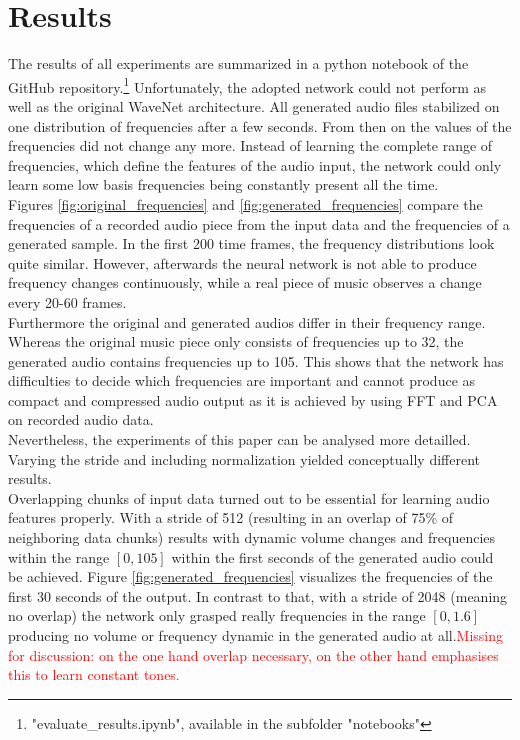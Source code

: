 \documentclass[10pt,conference,compsocconf]{IEEEtran}
\begin{document}
\section{Results}
The results of all experiments are summarized in a python notebook of the GitHub repository.\footnote{"evaluate\_results.ipynb", available in the subfolder "notebooks"} Unfortunately, the adopted network could not perform as well as the original WaveNet architecture. All generated audio files stabilized on one distribution of frequencies after a few seconds. From then on the values of the frequencies did not change any more. Instead of learning the complete range of frequencies, which define the features of the audio input, the network could only learn some low basis frequencies being constantly present all the time.\\
Figures \ref{fig:original_frequencies} and \ref{fig:generated_frequencies} compare the frequencies of a recorded audio piece from the input data and the frequencies of a generated sample. In the first 200 time frames, the frequency distributions look quite similar. However, afterwards the neural network is not able to produce frequency changes continuously, while a real piece of music observes a change every 20-60 frames.\\
Furthermore the original and generated audios differ in their frequency range. Whereas the original music piece only consists of frequencies up to 32, the generated audio contains frequencies up to 105. This shows that the network has difficulties to decide which frequencies are important and cannot produce as compact and compressed audio output as it is achieved by using FFT and PCA on recorded audio data.\\
Nevertheless, the experiments of this paper can be analysed more detailled. Varying the stride and including normalization yielded conceptually different results.\\
Overlapping chunks of input data turned out to be essential for learning audio features properly. With a stride of 512 (resulting in an overlap of 75\% of neighboring data chunks) results with dynamic volume changes and frequencies within the range $[0, 105]$ within the first seconds of the generated audio could be achieved. Figure \ref{fig:generated_frequencies} visualizes the frequencies of the first 30 seconds of the output. In contrast to that, with a stride of 2048 (meaning no overlap) the network only grasped really frequencies in the range $[0,1.6]$ producing no volume or frequency dynamic in the generated audio at all.\textcolor{red}{Missing for discussion: on the one hand overlap necessary, on the other hand emphasises this to learn constant tones.}\\
\end{document}
